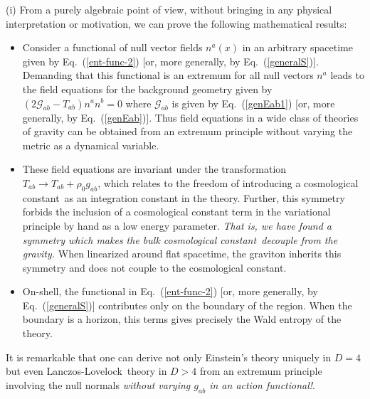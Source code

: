\documentclass[12pt]{iopart}
\def\eq#1{{Eq.~(\ref{#1})}}
\newcommand{\LL}{Lanczos-Lovelock}
\newcommand{\cc}{cosmological constant}
\begin{document}
(i) From a purely algebraic point of view, without bringing in any physical interpretation or motivation, we can prove the following mathematical results: 
\begin{itemize}
\item
Consider a functional of null vector fields $n^a(x)$ in an arbitrary spacetime given by
\eq{ent-func-2} [or, more generally, by \eq{generalS}]. Demanding that this functional is an extremum for all null vectors $n^a$ leads to the field equations for the background geometry given by $(2\mathcal{G}_{ab}-T_{ab})n^an^b=0$ where $\mathcal{G}_{ab}$ is given by \eq{genEab1} [or, more generally, by \eq{genEab}]. Thus field equations in a wide class of theories of gravity can be obtained from an extremum principle without varying the metric as a dynamical variable.
\item
These field equations are invariant under the transformation 
$T_{ab} \to T_{ab} + \rho_0 g_{ab}$, which 
relates to the freedom of introducing a  \cc\ as an integration constant in the theory. Further, this symmetry forbids the inclusion of a cosmological constant  term in the variational principle by hand as a low energy parameter. \textit{That is, we have found a symmetry which makes the bulk \cc\ decouple from the gravity.} When linearized around flat spacetime, the graviton inherits this symmetry and does not couple to the \cc .
\item
On-shell, the functional in \eq{ent-func-2} [or, more generally, by \eq{generalS}] contributes only on the boundary of the region. When the boundary is a horizon, this terms gives precisely the Wald entropy of the theory.
\end{itemize}
 It is remarkable that one can derive not only Einstein's theory uniquely in $D=4$ but even \LL\ theory in $D>4$ from an extremum principle involving the null normals \textit{without varying $g_{ab}$ in an action functional!}. 
 
\end{document}
